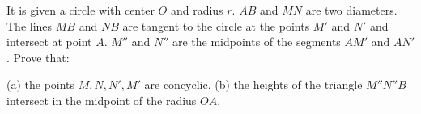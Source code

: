 It is given a circle with center $O$ and radius $r$. $AB$ and $MN$ are two diameters. The lines $MB$ and $NB$ are tangent to the circle at the points $M'$ and $N'$ and intersect at point $A$. $M''$ and $N''$ are the midpoints of the segments $AM'$ and $AN'$. Prove that:

(a) the points $M,N,N',M'$ are concyclic.
(b) the heights of the triangle $M''N''B$ intersect in the midpoint of the radius $OA$.